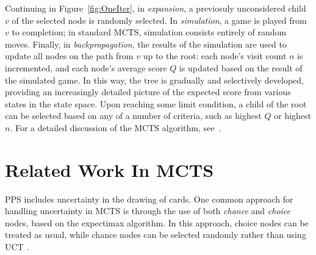 \documentclass[letterpaper]{article}
\begin{document}
Continuing in Figure~\ref{fig:OneIter}, in {\it expansion}, a previosuly unconsidered child $v$ of the selected node is randomly selected. In {\it simulation}, a game is played from $v$ to completion; in standard MCTS, simulation consists entirely of random moves. Finally, in {\it backpropagation}, the results of the simulation are used to update all nodes on the path from $v$ up to the root: each node's visit count $n$ is incremented, and each node's average score $Q$ is updated based on the result of the simulated game. In this way, the tree is gradually and selectively developed, providing an increasingly detailed picture of the expected score from various states in the state space. Upon reaching some limit condition, a child of the root can be selected based on any of a number of criteria, such as highest $Q$ or highest $n$. For a detailed discussion of the MCTS algorithm, see~\cite{browne2012survey}.

\section{Related Work In MCTS}




PPS includes uncertainty in the drawing of cards. One common approach for handling uncertainty in MCTS is through the use of both {\it chance} and {\it choice} nodes, based on the expectimax  algorithm. In this approach, choice nodes can be treated as usual, while chance nodes can be selected randomly rather than using UCT \cite{melko2007optimal,hauk2004search}.
\end{document}
